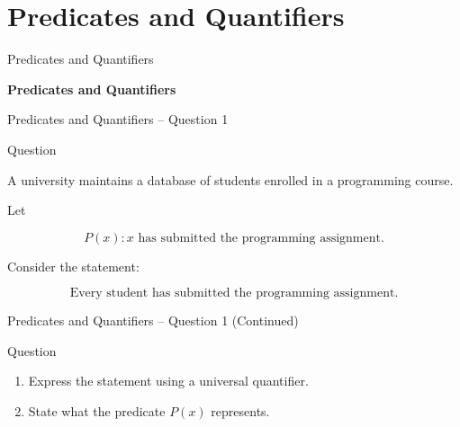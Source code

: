 \section{Predicates and Quantifiers}


\begin{frame}{Predicates and Quantifiers}

\begin{center}
\vspace{1cm}
{\Huge\textbf{Predicates and Quantifiers}}

\vspace{0.6cm}


\end{center}

\end{frame}


\begin{frame}{Predicates and Quantifiers -- Question 1}

\begin{block}{Question}

A university maintains a database of students enrolled in a
programming course.

Let

$$
P(x):\text{$x$ has submitted the programming assignment}.
$$

Consider the statement:

$$
\text{Every student has submitted the programming assignment.}
$$

\end{block}

\end{frame}

\begin{frame}{Predicates and Quantifiers -- Question 1 (Continued)}

\begin{block}{Question}

\begin{enumerate}
\item Express the statement using a universal quantifier.
\item State what the predicate $P(x)$ represents.
\end{enumerate}

\end{block}

\end{frame}


